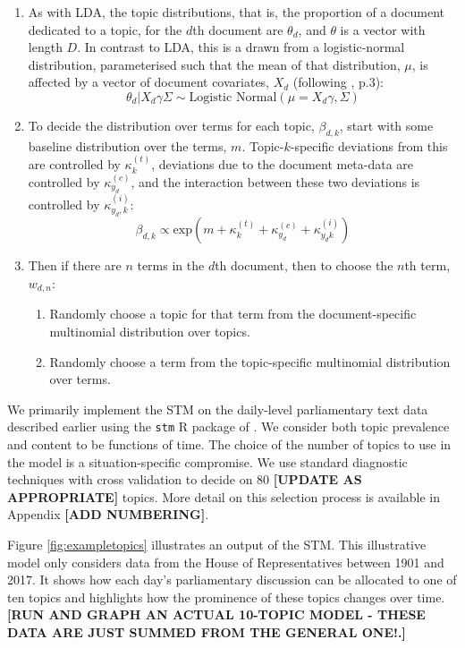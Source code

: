 \documentclass[12pt,]{article}
\providecommand{\tightlist}{%
\setlength{\itemsep}{0pt}\setlength{\parskip}{0pt}}
\theoremstyle{definition}
\theoremstyle{definition}
\theoremstyle{definition}
\theoremstyle{remark}
\begin{document}
\begin{enumerate}
\def\labelenumi{\arabic{enumi}.}
\item
  As with LDA, the topic distributions, that is, the proportion of a
  document dedicated to a topic, for the \(d\)th document are
  \(\theta_d\), and \(\theta\) is a vector with length \(D\). In
  contrast to LDA, this is a drawn from a logistic-normal distribution,
  parameterised such that the mean of that distribution, \(\mu\), is
  affected by a vector of document covariates, \(X_d\) (following
  \citet{RobertsStewartTingley2018}, p.3):
  \[\theta_d|X_d\gamma\Sigma \sim \mbox{Logistic Normal}(\mu = X_d\gamma, \Sigma)\]
\item
  To decide the distribution over terms for each topic, \(\beta_{d,k}\),
  start with some baseline distribution over the terms, \(m\).
  Topic-\(k\)-specific deviations from this are controlled by
  \(\kappa_k^{(t)}\), deviations due to the document meta-data are
  controlled by \(\kappa_{y_d}^{(c)}\), and the interaction between
  these two deviations is controlled by \(\kappa_{y_d,k}^{(i)}\):
  \[\beta_{d,k}\propto \mbox{exp}\left(m+\kappa^{(t)}_{k} + \kappa_{y_d}^{(c)} + \kappa_{y_{d}k}^{(i)}\right) \]
\item
  Then if there are \(n\) terms in the \(d\)th document, then to choose
  the \(n\)th term, \(w_{d,n}\):

  \begin{enumerate}
  \def\labelenumii{\alph{enumii}.}
  \tightlist
  \item
    Randomly choose a topic for that term from the document-specific
    multinomial distribution over topics.
  \item
    Randomly choose a term from the topic-specific multinomial
    distribution over terms.
  \end{enumerate}
\end{enumerate}

We primarily implement the STM on the daily-level parliamentary text
data described earlier using the \texttt{stm} R package of
\citet{RobertsStewartAiroldiRPackage}. We consider both topic prevalence
and content to be functions of time. The choice of the number of topics
to use in the model is a situation-specific compromise. We use standard
diagnostic techniques with cross validation to decide on 80
\textbf{{[}UPDATE AS APPROPRIATE{]}} topics. More detail on this
selection process is available in Appendix \textbf{{[}ADD NUMBERING{]}}.

Figure \ref{fig:exampletopics} illustrates an output of the STM. This
illustrative model only considers data from the House of Representatives
between 1901 and 2017. It shows how each day's parliamentary discussion
can be allocated to one of ten topics and highlights how the prominence
of these topics changes over time. \textbf{{[}RUN AND GRAPH AN ACTUAL
10-TOPIC MODEL - THESE DATA ARE JUST SUMMED FROM THE GENERAL ONE!.{]}}
\end{document}
